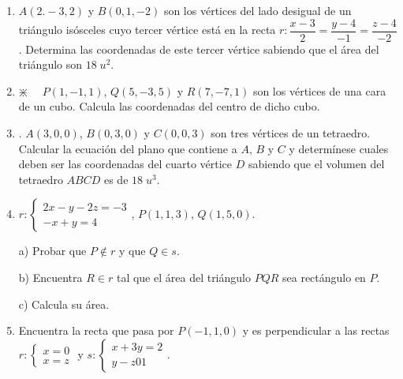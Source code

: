 \begin{enumerate}
\item $A(2.-3,2)$ y $B(0,1,-2)$ son los vértices del lado desigual de un triángulo isósceles cuyo tercer vértice está en la recta $r:\dfrac{x-3}{2}=\dfrac{y-4}{-1}=\dfrac{z-4}{-2}$. Determina las coordenadas de este tercer vértice sabiendo que el área del triángulo son $18\; u^2$.

\vspace{2mm} 

\item $\divideontimes\quad$ $P(1,-1,1)$, $Q(5,-3,5)$ y $R(7,-7,1)$ son los vértices de una cara de un cubo. Calcula las coordenadas del centro de dicho cubo.

\vspace{2mm} 

\item. $A(3,0,0)$, $B(0,3,0)$ y $C(0,0,3)$ son tres vértices de un tetraedro. Calcular la ecuación del plano que contiene a $A$, $B$ y $C$ y determínese cuales deben ser las coordenadas del cuarto vértice $D$ sabiendo que el volumen del tetraedro $ABCD$ es de $18\; u^3$.

\vspace{2mm} 


\item $r:\begin{cases}2x-y-2z=-3\\-x+y=4\end{cases}$, $P(1,1,3)$, $Q(1,5,0)$.

a) Probar que $P\notin r$ y que  $Q\in s$.

b) Encuentra $R\in r$ tal que el área del triángulo $PQR$ sea rectángulo en $P$.

c) Calcula su área.

\vspace{2mm} 

\item Encuentra la recta que pasa por $P(-1,1,0)$ y es perpendicular a las rectas $r:\begin{cases}x=0\\x=z\end{cases}$ y $s:\begin{cases}x+3y=2\\y-z01\end{cases}$.


\end{enumerate}
